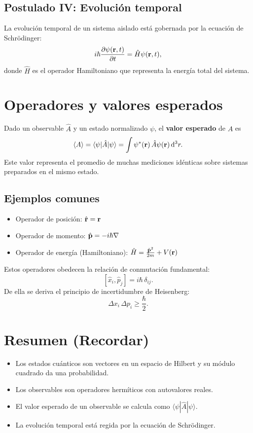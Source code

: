 \documentclass[11pt]{article}
\begin{document}
\subsection{Postulado IV: Evolución temporal}
La evolución temporal de un sistema aislado está gobernada por la ecuación de Schrödinger:
\[
i\hbar \pdv{\psi(\vb{r},t)}{t} = \hat{H}\psi(\vb{r},t),
\]
donde \(\hat{H}\) es el operador Hamiltoniano que representa la energía total del sistema.

\section{Operadores y valores esperados}
\label{sec:esperados}

Dado un observable \(\hat{A}\) y un estado normalizado \(\psi\), el \textbf{valor esperado} de \(A\) es
\[
\langle A \rangle = \langle \psi | \hat{A} | \psi \rangle
= \int \psi^*(\vb{r})\,\hat{A}\psi(\vb{r})\,\dd^3 r.
\]
Este valor representa el promedio de muchas mediciones idénticas sobre sistemas preparados en el mismo estado.

\subsection{Ejemplos comunes}
\begin{itemize}
\item Operador de posición: \(\hat{\vb{r}} = \vb{r}\)
\item Operador de momento: \(\hat{\vb{p}} = -i\hbar\nabla\)
\item Operador de energía (Hamiltoniano): \(\hat{H} = \frac{\hat{\vb{p}}^2}{2m} + V(\vb{r})\)
\end{itemize}

Estos operadores obedecen la relación de conmutación fundamental:
\[
[\hat{x}_i,\hat{p}_j] = i\hbar\,\delta_{ij}.
\]
De ella se deriva el principio de incertidumbre de Heisenberg:
\[
\Delta x_i\,\Delta p_i \geq \frac{\hbar}{2}.
\]

\section*{Resumen (Recordar)}
\begin{itemize}
\item Los estados cuánticos son vectores en un espacio de Hilbert y su módulo cuadrado da una probabilidad.
\item Los observables son operadores hermíticos con autovalores reales.
\item El valor esperado de un observable se calcula como \(\langle \psi|\hat{A}|\psi\rangle\).
\item La evolución temporal está regida por la ecuación de Schrödinger.
\end{itemize}
\end{document}
